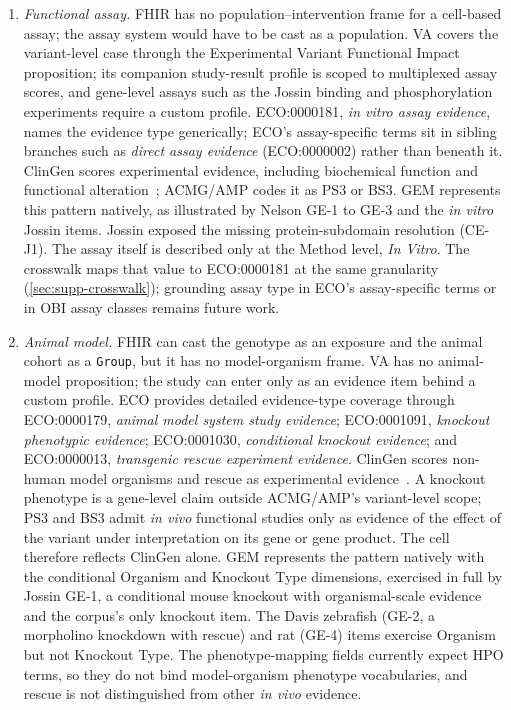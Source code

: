 \begin{enumerate}
  \item \emph{Functional assay.} FHIR has no population--intervention frame
    for a cell-based assay; the assay system would have to be cast as a
    population. VA covers the variant-level case through the Experimental
    Variant Functional Impact proposition; its companion study-result
    profile is scoped to multiplexed assay scores, and gene-level assays
    such as the Jossin binding and phosphorylation experiments require a
    custom profile. ECO:0000181, \emph{in vitro assay evidence}, names the
    evidence type generically; ECO's assay-specific terms sit in sibling
    branches such as \emph{direct assay evidence} (ECO:0000002) rather
    than beneath it. ClinGen scores experimental evidence, including biochemical
    function and functional alteration~\cite{strande2017}; ACMG/AMP codes
    it as PS3 or BS3. GEM represents this pattern natively, as illustrated
    by Nelson GE-1 to GE-3 and the \emph{in vitro} Jossin items. Jossin
    exposed the missing protein-subdomain resolution (CE-J1). The assay
    itself is described only at the Method level, \emph{In Vitro}. The
    crosswalk maps that value to ECO:0000181 at the same granularity
    (\cref{sec:supp-crosswalk}); grounding assay type in ECO's
    assay-specific terms or in OBI assay classes remains future work.

  \item \emph{Animal model.} FHIR can cast the genotype as an exposure and
    the animal cohort as a \texttt{Group}, but it has no model-organism
    frame. VA has no animal-model proposition; the study can enter only as
    an evidence item behind a custom profile. ECO provides detailed
    evidence-type coverage through ECO:0000179,
    \emph{animal model system study evidence}; ECO:0001091,
    \emph{knockout phenotypic evidence}; ECO:0001030,
    \emph{conditional knockout evidence}; and ECO:0000013,
    \emph{transgenic rescue experiment evidence}. ClinGen scores
    non-human model organisms and rescue as experimental
    evidence~\cite{strande2017}. A knockout phenotype is a gene-level claim
    outside ACMG/AMP's variant-level scope; PS3 and BS3 admit \emph{in
    vivo} functional studies only as evidence of the effect of the variant
    under interpretation on its gene or gene product. The cell therefore
    reflects ClinGen alone. GEM represents the pattern natively with
    the conditional Organism and Knockout Type dimensions, exercised in
    full by Jossin GE-1, a conditional mouse knockout with organismal-scale
    evidence and the corpus's only knockout item. The Davis zebrafish
    (GE-2, a morpholino knockdown with rescue) and rat (GE-4) items
    exercise Organism but not Knockout Type. The
    phenotype-mapping fields currently expect HPO terms, so they do not bind
    model-organism phenotype vocabularies, and rescue is not distinguished
    from other \emph{in vivo} evidence.


\end{enumerate}
